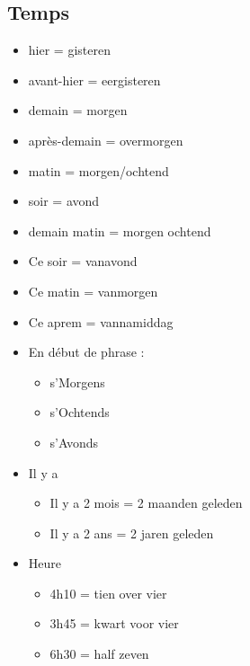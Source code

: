 \documentclass[a4paper]{article}
\begin{document}
\subsection{Temps}
\begin{itemize}[label=\textbullet, font=\Large]
  \item hier = gisteren
  \item avant-hier = eergisteren
  \item demain = morgen
  \item après-demain = overmorgen
  \item matin = morgen/ochtend
  \item soir = avond
  \item demain matin = morgen ochtend
  \item Ce soir = vanavond
  \item Ce matin = vanmorgen
  \item Ce aprem = vannamiddag
  \item En début de phrase : 
  \begin{itemize}[label=, font=\scriptsize]
    \item s'Morgens
    \item s'Ochtends
    \item s'Avonds
  \end{itemize}
  \item Il y a
  \begin{itemize}
    \item Il y a 2 mois = 2 maanden geleden
    \item Il y a 2 ans = 2 jaren geleden 
  \end{itemize} 
  \item Heure
  \begin{itemize}
    \item 4h10 = tien over vier
    \item 3h45 = kwart voor vier
    \item 6h30 = half zeven
  \end{itemize}
\end{itemize}

\newpage
\end{document}
